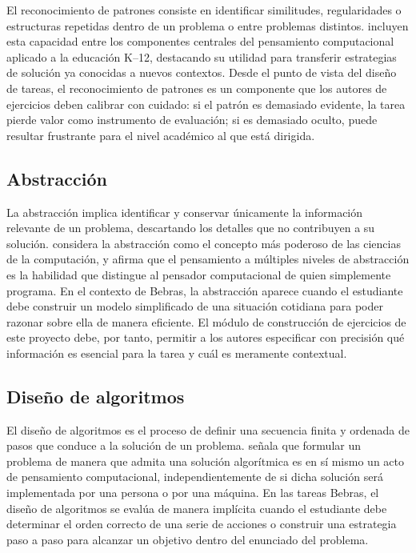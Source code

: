 El reconocimiento de patrones consiste en identificar similitudes, regularidades o estructuras repetidas dentro de un problema o entre problemas distintos. \textcite[39]{grover2013} incluyen esta capacidad entre los componentes centrales del pensamiento computacional aplicado a la educación K--12, destacando su utilidad para transferir estrategias de solución ya conocidas a nuevos contextos. Desde el punto de vista del diseño de tareas, el reconocimiento de patrones es un componente que los autores de ejercicios deben calibrar con cuidado: si el patrón es demasiado evidente, la tarea pierde valor como instrumento de evaluación; si es demasiado oculto, puede resultar frustrante para el nivel académico al que está dirigida.

\subsection{Abstracción}

La abstracción implica identificar y conservar únicamente la información relevante de un problema, descartando los detalles que no contribuyen a su solución. \textcite[35]{wing2006} considera la abstracción como el concepto más poderoso de las ciencias de la computación, y afirma que el pensamiento a múltiples niveles de abstracción es la habilidad que distingue al pensador computacional de quien simplemente programa. En el contexto de Bebras, la abstracción aparece cuando el estudiante debe construir un modelo simplificado de una situación cotidiana para poder razonar sobre ella de manera eficiente. El módulo de construcción de ejercicios de este proyecto debe, por tanto, permitir a los autores especificar con precisión qué información es esencial para la tarea y cuál es meramente contextual.

\subsection{Diseño de algoritmos}

El diseño de algoritmos es el proceso de definir una secuencia finita y ordenada de pasos que conduce a la solución de un problema. \textcite[33]{wing2006} señala que formular un problema de manera que admita una solución algorítmica es en sí mismo un acto de pensamiento computacional, independientemente de si dicha solución será implementada por una persona o por una máquina. En las tareas Bebras, el diseño de algoritmos se evalúa de manera implícita cuando el estudiante debe determinar el orden correcto de una serie de acciones o construir una estrategia paso a paso para alcanzar un objetivo dentro del enunciado del problema.

